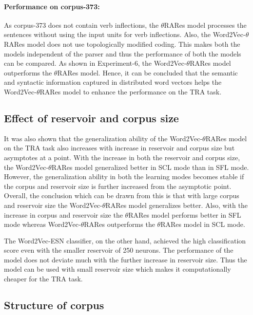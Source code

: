 \paragraph{Performance on corpus-373:} As corpus-373 does not contain verb inflections, the $\theta$RARes model processes the sentences without using the input units for verb inflections. Also, the Word2Vec-$\theta$RARes model does not use topologically modified coding. This makes both the models independent of the parser and thus the performance of both the models can be compared. As shown in Experiment-6, the Word2Vec-$\theta$RARes model outperforms the $\theta$RARes model. Hence, it can be concluded that the semantic and syntactic information captured in distributed word vectors helps the Word2Vec-$\theta$RARes model to enhance the performance on the TRA task.

\subsection{Effect of reservoir and corpus size}

It was also shown that the generalization ability of the Word2Vec-$\theta$RARes model on the TRA task also increases with increase in reservoir and corpus size but asymptotes at a point. With the increase in both the reservoir and corpus size, the Word2Vec-$\theta$RARes model generalized better in SCL mode than in SFL mode. However, the generalization ability in both the learning modes becomes stable if the corpus and reservoir size is further increased from the asymptotic point. Overall, the conclusion which can be drawn from this is that with large corpus and reservoir size the Word2Vec-$\theta$RARes model generalizes better. Also, with the increase in corpus and reservoir size the $\theta$RARes model performs better in SFL mode whereas Word2Vec-$\theta$RARes outperforms the $\theta$RARes model in SCL mode.

The Word2Vec-ESN classifier, on the other hand, achieved the high classification score even with the smaller reservoir of 250 neurons. The performance of the model does not deviate much with the further increase in reservoir size. Thus the model can be used with small reservoir size which makes it computationally cheaper for the TRA task.

\subsection{Structure of corpus}

